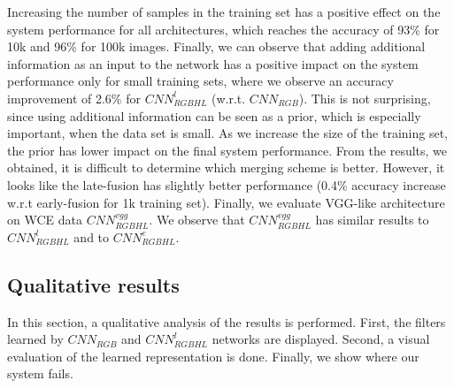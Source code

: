 \documentclass[review,12pt,3p]{elsarticle}
\begin{document}
Increasing the number of samples in the training set has a positive effect on the system performance for all architectures, which reaches the accuracy of 93\% for 10k and 96\% for 100k images. Finally, we can observe that adding additional information as an input to the network has a positive impact on the system performance only for small training sets, where we observe an accuracy improvement of 2.6\% for $CNN^l_{RGBHL}$ (w.r.t. $CNN_{RGB}$). This is not surprising, since using additional information can be seen as a prior, which is especially important, when the data set is small. As we increase the size of the training set, the prior has lower impact on the final system performance. From the results, we obtained, it is difficult to determine which merging scheme is better. However, it looks like the late-fusion has slightly better performance (0.4\% accuracy increase w.r.t early-fusion for 1k training set). Finally, we evaluate VGG-like architecture on WCE data $CNN^{vgg}_{RGBHL}$. We observe that $CNN^{vgg}_{RGBHL}$ has similar results to $CNN^l_{RGBHL}$ and to $CNN^e_{RGBHL}$.

\begin{table}[!ht]
\centering
{}
\caption{Introducing additional information. The numbers represent classification accuracy in percentages.}
\label{tab:fusion}
\end{table}


\subsection{Qualitative results}

In this section, a qualitative analysis of the results is performed. First, the filters learned by $CNN_{RGB}$ and $CNN^l_{RGBHL}$ networks are displayed. Second, a visual evaluation of the learned representation is done. Finally, we show where our system fails. 
\end{document}
